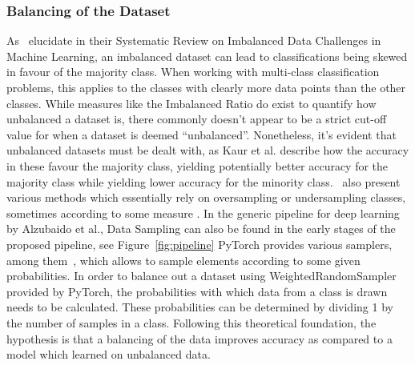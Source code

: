 \subsubsection{Balancing of the Dataset}\label{balancingtheory}
As~\citeauthor{kaurbalancing} elucidate in their Systematic Review on Imbalanced Data Challenges
in Machine Learning, an imbalanced dataset can lead to classifications being skewed in favour of the majority class. When working with multi-class classification problems, this applies to the classes with clearly more data points than the other classes. While measures like the Imbalanced Ratio \citep{kulkarni2020foundations} do exist to quantify how unbalanced a dataset is, there commonly doesn't appear to be a strict cut-off value for when a dataset is deemed ``unbalanced''. Nonetheless, it's evident that unbalanced datasets must be dealt with, as Kaur et al\@. describe how the accuracy in these favour the majority class, yielding potentially better accuracy for the majority class while yielding lower accuracy for the minority class.~\citeauthor{kaurbalancing} also present various methods which essentially rely on oversampling or undersampling classes, sometimes according to some measure \citep{kulkarni2020foundations}. In the generic pipeline for deep learning by Alzubaido et al., Data Sampling can also be found in the early stages of the proposed pipeline, see Figure~\ref{fig:pipeline} PyTorch provides various samplers, among them~\cite{pytorchTorchutilsdatax2014}, which allows to sample elements according to some given probabilities. In order to balance out a dataset using WeightedRandomSampler provided by PyTorch, the probabilities with which data from a class is drawn needs to be calculated. These probabilities can be determined by dividing 1 by the number of samples in a class. Following this theoretical foundation, the hypothesis is that a balancing of the data improves accuracy as compared to a model which learned on unbalanced data.



